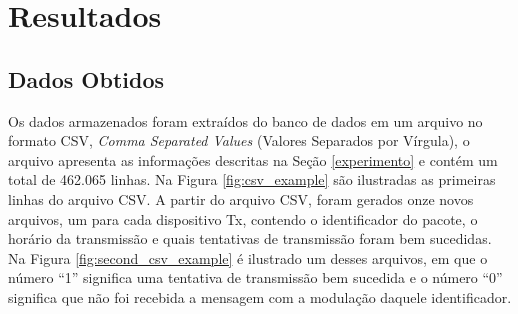 \chapter{Resultados}
\label{resultados}

\section{Dados Obtidos}
Os dados armazenados foram extraídos do banco de dados em um arquivo no formato CSV, \emph{Comma Separated Values} (Valores Separados por Vírgula), o arquivo apresenta as informações descritas na Seção \ref{experimento} e contém um total de 462.065 linhas. Na Figura \ref{fig:csv_example} são ilustradas as primeiras linhas do arquivo CSV. A partir do arquivo CSV, foram gerados onze novos arquivos, um para cada dispositivo Tx, contendo o identificador do pacote, o horário da transmissão e quais tentativas de transmissão foram bem sucedidas. Na Figura \ref{fig:second_csv_example} é ilustrado um desses arquivos, em que o número ``1'' significa uma tentativa de transmissão bem sucedida e o número ``0'' significa que não foi recebida a mensagem com a modulação daquele identificador.


